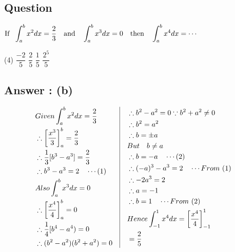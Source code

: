 \documentclass[17pt]{extarticle}
\begin{document}
\noindent
\begin{fleqn} 


\section{Question} 

$\begin{aligned}[t] 
\text{If \ } \int_{a}^{b} x^2 dx = \frac{2}{3} 
\text{\quad and\quad} 
\int_{a}^{b} x^3 dx = 0 
\text{\quad then\quad}
\int_{a}^{b} x^4 dx = \cdots
\end{aligned}$

\begin{tasks}(4)
  \task $\dfrac{-2}{5}$ 
  \task $\dfrac{2}{5}$ 
  \task $\dfrac{1}{5}$ 
  \task $\dfrac{2^5}{5}$
\end{tasks}
\subsection*{Answer : (b)}
\begin{equation} \nonumber
\begin{alignedat}{4}
& Given \int_{a}^{b} x^2 dx = \frac{2}{3}\\
& \therefore \left[ \frac{x^3}{3}\right]_{a}^{b} = \frac{2}{3}\\
& \therefore \frac{1}{3}[b^3 - a^3] = \frac{2}{3}\\
& \therefore b^3 - a^3=2 \quad \cdots (1)\\
& Also \int_{a}^{b} x^3 dx = 0\\
& \therefore \left[ \frac{x^4}{4}\right]_{a}^{b} = 0\\
& \therefore \frac{1}{4}[b^4 - a^4) = 0\\
& \therefore (b^2 - a^2)(b^2+a^2)=0 \\
\end{alignedat}
\quad
\vrule
\quad
\begin{alignedat}{4}
& \therefore b^2 - a^2=0 \because b^2+a^2 \neq 0\\
& \therefore b^2 = a^2\\
& \therefore b = \pm a\\
& But \quad b \neq a \\
& \therefore b = -a \quad \cdots (2) \\
& \therefore (-a)^3 - a^3=2 \quad \cdots From\ (1) \\
& \therefore -2a^3=2 \\
& \therefore a = -1 \\
& \therefore b = 1 \quad \cdots From\ (2) \\
& Hence \int_{-1}^{1} x^4 dx = \left[ \frac{x^4}{4}\right]_{-1}^{1}\\
& = \frac{2}{5}
\end{alignedat}
\end{equation}


\end{fleqn}
\end{document}
